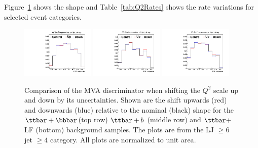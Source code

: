 \begin{description}
  Figure~\ref{fig:Q2Plots} shows the shape and Table~\ref{tab:Q2Rates} shows the rate variations for
  selected event categories.

\begin{figure}[hbtp]
 \begin{center}
   \includegraphics[width=0.31\textwidth]{Figures/Analysis_2_Diagrams/SystPlot_Q2scale_ttH_ttbar_bb_ttbarPlusBBbar_ljets_jge6_tge4}
   \includegraphics[width=0.31\textwidth]{Figures/Analysis_2_Diagrams/SystPlot_Q2scale_ttH_ttbar_b_ttbarPlusB_ljets_jge6_tge4}
   \includegraphics[width=0.31\textwidth]{Figures/Analysis_2_Diagrams/SystPlot_Q2scale_ttH_ttbar2p_ttbar_ljets_jge6_tge4}
   \caption{ Comparison of the MVA discriminator when shifting the
     $Q^2$ scale up and down by its uncertainties.  Shown are the
     shift upwards (red) and downwards (blue) relative to the nominal
     (black) shape for the $\ttbar+\bbbar$(top row) $\ttbar+b$ (middle
     row) and $\ttbar+$LF (bottom) background samples.  The plots are
     from the LJ $\geq 6$ jet $\geq 4$ category.  All
     plots are normalized to unit area.}
   \label{fig:Q2Plots}
 \end{center}
\end{figure}



\end{description}
